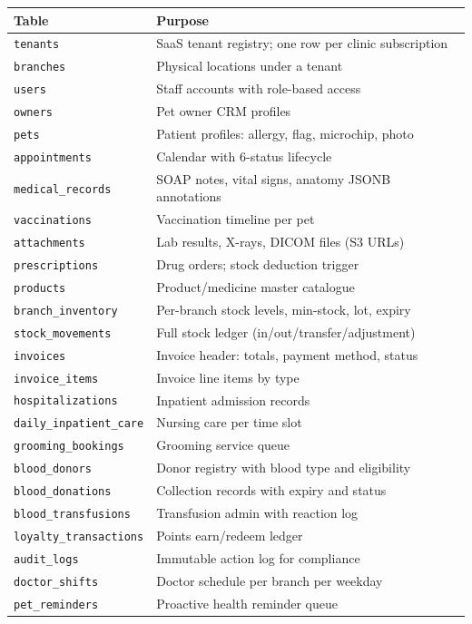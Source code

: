 \documentclass[12pt,a4paper]{report}
\begin{document}
\begin{longtable}{L{4.5cm} L{9cm}}
\toprule
\textbf{Table} & \textbf{Purpose} \\\midrule\endhead\bottomrule\endfoot
\texttt{tenants}               & SaaS tenant registry; one row per clinic subscription \\
\texttt{branches}              & Physical locations under a tenant \\
\texttt{users}                 & Staff accounts with role-based access \\
\texttt{owners}                & Pet owner CRM profiles \\
\texttt{pets}                  & Patient profiles: allergy, flag, microchip, photo \\
\texttt{appointments}          & Calendar with 6-status lifecycle \\
\texttt{medical\_records}      & SOAP notes, vital signs, anatomy JSONB annotations \\
\texttt{vaccinations}          & Vaccination timeline per pet \\
\texttt{attachments}           & Lab results, X-rays, DICOM files (S3 URLs) \\
\texttt{prescriptions}         & Drug orders; stock deduction trigger \\
\texttt{products}              & Product/medicine master catalogue \\
\texttt{branch\_inventory}     & Per-branch stock levels, min-stock, lot, expiry \\
\texttt{stock\_movements}      & Full stock ledger (in/out/transfer/adjustment) \\
\texttt{invoices}              & Invoice header: totals, payment method, status \\
\texttt{invoice\_items}        & Invoice line items by type \\
\texttt{hospitalizations}      & Inpatient admission records \\
\texttt{daily\_inpatient\_care} & Nursing care per time slot \\
\texttt{grooming\_bookings}    & Grooming service queue \\
\texttt{blood\_donors}         & Donor registry with blood type and eligibility \\
\texttt{blood\_donations}      & Collection records with expiry and status \\
\texttt{blood\_transfusions}   & Transfusion admin with reaction log \\
\texttt{loyalty\_transactions} & Points earn/redeem ledger \\
\texttt{audit\_logs}           & Immutable action log for compliance \\
\texttt{doctor\_shifts}        & Doctor schedule per branch per weekday \\
\texttt{pet\_reminders}        & Proactive health reminder queue \\
\end{longtable}
\end{document}
